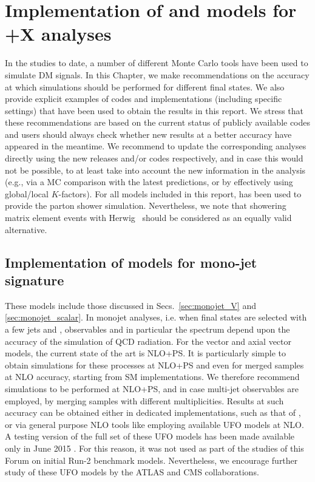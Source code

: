 \section{\texorpdfstring{Implementation of \schannel and \tchannel models for \MET+X analyses}{Implementation of \schannel and \tchannel models for MET+X analyses}}

In the studies to date, a number of different Monte Carlo tools have
been used to simulate DM signals.  In this Chapter, we make recommendations 
on the accuracy at which simulations should be performed for different final states. We 
also provide explicit examples  of codes and implementations (including specific settings) 
that have been used to obtain the results in this report.
We stress that these recommendations are based on the current
status of publicly available codes and users should always check whether new results
at a better accuracy have appeared in the meantime. We recommend to update
the corresponding analyses  directly using the new releases and/or codes respectively, and in case this would not be possible,
to at least take into account the new information in the analysis (e.g., via a MC comparison with the latest predictions, 
or by effectively using global/local $K$-factors). For all models included in this report, 
\pythiaEight has been used to provide the parton shower simulation. Nevertheless, 
we note that showering matrix element events with Herwig~\cite{Bahr:2008pv,Corcella:2002jc,Corcella:2000bw,Marchesini1992465} should be considered as 
an equally valid alternative.

\subsection{Implementation of  \schannel  models for mono-jet signature}
\label{sec:monojet_implementation}

These models include those discussed in Secs.~\ref{sec:monojet_V} and \ref{sec:monojet_scalar}.
In monojet analyses, i.e. when final states are selected with a few jets and \MET{}, observables and in particular the \MET{} spectrum depend upon the accuracy of the simulation of QCD radiation.
For the vector and axial vector models, the current state of the art is  NLO+PS. It is particularly simple to obtain simulations for these processes at NLO+PS and even for merged samples at NLO accuracy, starting from SM implementations.  We therefore recommend simulations to be performed at NLO+PS, and in case multi-jet observables are employed,  by merging samples with different multiplicities. 
Results at such accuracy can be obtained either in dedicated implementations, such as that of  \powheg \cite{Haisch:2013ata}, or via general purpose NLO tools like \madgraph employing available UFO models at NLO. A testing version of the full set of these UFO models has been made available
only in June 2015 \cite{NewMadgraphModels}. For this reason, it was not used as part of the studies of this Forum on initial Run-2 benchmark models. Nevertheless, we encourage further study of these UFO models by the ATLAS and CMS collaborations.

